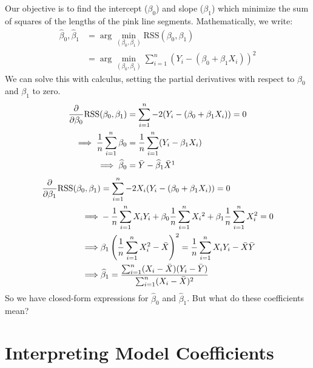 \documentclass[twoside]{article}
\theoremstyle{definition}
\begin{document}
Our objective is to find the intercept ($\beta_0$) and slope ($\beta_1$) which minimize the sum of squares of the lengths of the pink line segments. Mathematically, we write:
\begin{align}
    \widehat{\beta}_0, \widehat{\beta}_1 &= \arg\min_{(\beta_0, \beta_1)} \text{RSS}(\beta_0, \beta_1) \nonumber \\
    &= \arg\min_{(\beta_0, \beta_1)} \sum_{i=1}^n (Y_i - (\beta_0 + \beta_1 X_i))^2
\end{align}
We can solve this with calculus, setting the partial derivatives with respect to $\beta_0$ and $\beta_1$ to zero.
\begin{align}
    \frac{\partial}{\partial \beta_0} \text{RSS}(\beta_0, \beta_1) &= \sum_{i=1}^n -2(Y_i - (\beta_0 + \beta_1 X_i)) = 0 \nonumber \\
    \implies \frac{1}{n} \sum_{i=1}^n \beta_0 &= \frac{1}{n} \sum_{i=1}^n (Y_i - \beta_1 X_i) \nonumber \\
    \implies \widehat{\beta}_0 &= \bar{Y} - \widehat{\beta}_1 \bar{X}\label{eq:beta0}\footnotemark
\end{align}
\begin{align}
    \frac{\partial}{\partial \beta_1} \text{RSS}(\beta_0, \beta_1) &= \sum_{i=1}^n -2X_i(Y_i - (\beta_0 + \beta_1 X_i)) = 0 \nonumber \\
    \implies& -\frac{1}{n}\sum_{i=1}^n X_i Y_i + \beta_0 \frac{1}{n} \sum_{i=1}^n X_i\footnotemark + \beta_1 \frac{1}{n} \sum_{i=1}^n X_i^2 = 0 \nonumber \\
    \implies& \beta_1\left(\frac{1}{n} \sum_{i=1}^n X_i^2 - \bar{X}\right)^2 = \frac{1}{n} \sum_{i=1}^n X_i Y_i - \bar X \bar Y\nonumber \\
    \implies& \widehat \beta_1 = \frac{\sum_{i=1}^n (X_i - \bar{X})(Y_i - \bar{Y})}{\sum_{i=1}^n (X_i - \bar{X})^2}\label{eq:beta1}
\end{align}
So we have closed-form expressions for $\widehat{\beta}_0$ and $\widehat{\beta}_1$. But what do these coefficients mean?

\section{Interpreting Model Coefficients}
\end{document}
